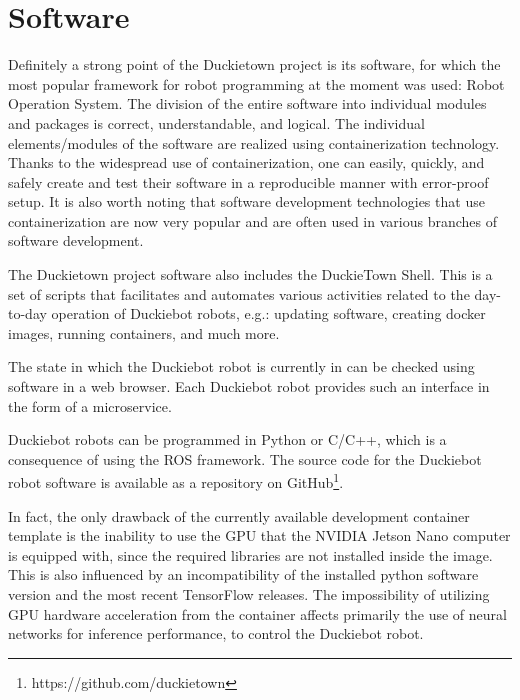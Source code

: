 \documentclass[conference]{IEEEtran}
\begin{document}
\section{Software}\label{sec:software}
Definitely a strong point of the Duckietown project is its software, for which the most popular framework for robot programming at the moment was used: Robot Operation System.
The division of the entire software into individual modules and packages is correct, understandable, and logical. 
The individual elements/modules of the software are realized using containerization technology. Thanks to the widespread use of containerization, one can easily, quickly, and safely create and test their software in a reproducible manner with error-proof setup. It is also worth noting that software development technologies that use containerization are now very popular and are often used in various branches of software development.

The Duckietown project software also includes the DuckieTown Shell. This is a set of scripts that facilitates and automates various activities related to the day-to-day operation of Duckiebot robots, e.g.: updating software, creating docker images, running containers, and much more.

The state in which the Duckiebot robot is currently in can be checked using software in a web browser. Each Duckiebot robot provides such an interface in the form of a microservice.

Duckiebot robots can be programmed in Python or C/C++, which is a consequence of using the ROS framework. The source code for the Duckiebot robot software is available as a repository on GitHub\footnote{https://github.com/duckietown}.

In fact, the only drawback of the currently available development container template is the inability to use the GPU that the NVIDIA Jetson Nano computer is equipped with, since the required libraries are not installed inside the image. This is also influenced by an incompatibility of the installed python software version and the most recent TensorFlow releases. The impossibility of utilizing GPU hardware acceleration from the container affects primarily the use of neural networks for inference performance, to control the Duckiebot robot.
\end{document}
